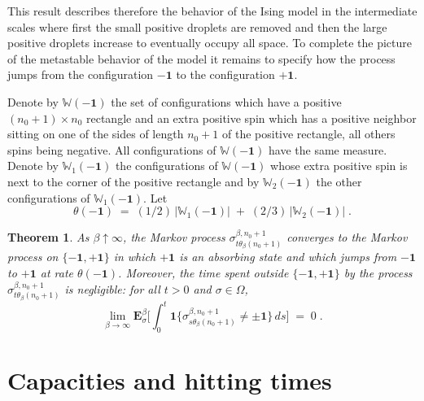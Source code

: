 \documentclass[reqno]{amsart}
\newtheorem{theorem}{Theorem}[section]
\begin{document}
This result describes therefore the behavior of the Ising model in the
intermediate scales where first the small positive droplets are
removed and then the large positive droplets increase to eventually
occupy all space. To complete the picture of the metastable behavior
of the model it remains to specify how the process jumps from the
configuration $-{{\mathbf 1}}$ to the configuration $+ {{\mathbf 1}}$.

Denote by ${{\mathbb W}}(-{{\mathbf 1}})$ the set of configurations which have a
positive $(n_0+1)\times n_0$ rectangle and an extra positive spin
which has a positive neighbor sitting on one of the sides of length
$n_0+1$ of the positive rectangle, all others spins being
negative. All configurations of ${{\mathbb W}}(-{{\mathbf 1}})$ have the same measure.
Denote by ${{\mathbb W}}_1(-{{\mathbf 1}})$ the configurations of ${{\mathbb W}}(-{{\mathbf 1}})$
whose extra positive spin is next to the corner of the positive
rectangle and by ${{\mathbb W}}_2(-{{\mathbf 1}})$ the other configurations of ${{\mathbb W}}_1(-{{\mathbf 1}})$. Let
\begin{equation*}
\theta(-{{\mathbf 1}}) \;=\; (1/2) \, |{{\mathbb W}}_1(-{{\mathbf 1}})| \;+\; (2/3) \, |{{\mathbb W}}_2(-{{\mathbf 1}})| \;.
\end{equation*}

\begin{theorem}
\label{t08}
As $\beta\uparrow\infty$, the Markov process $\sigma^{\beta,n_0+1}_{t
  \theta_\beta (n_0+1)}$ converges to the Markov process on $\{-{{\mathbf 1}},
+ {{\mathbf 1}}\}$ in which $+{{\mathbf 1}}$ is an absorbing state and which jumps
from $-{{\mathbf 1}}$ to $+ {{\mathbf 1}}$ at rate $\theta(-{{\mathbf 1}})$.  Moreover, the
time spent outside $\{-{{\mathbf 1}}, + {{\mathbf 1}}\}$ by the process
$\sigma^{\beta,n_0+1}_{t \theta_\beta (n_0+1)}$ is negligible: for all
$t>0$ and $\sigma\in \Omega$,
\begin{equation*}
\lim_{\beta\to\infty} {{\mathbf E}}^\beta_\sigma \Big[ \int_0^t {{\mathbf 1}}\{ 
\sigma^{\beta,n_0+1}_{s \theta_\beta (n_0+1)} \not = \pm {{\mathbf 1}}\}\, ds 
\Big]\;=\; 0\;. 
\end{equation*}
\end{theorem}

\section{Capacities and hitting times}
\label{ssec1}
\end{document}
